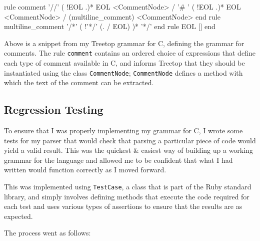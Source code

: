 \begin{code}[language=treetop]
  rule comment
    '//' ( !EOL .)* EOL <CommentNode>
    / '# ' ( !EOL .)* EOL <CommentNode>
    / (multiline_comment) <CommentNode>
  end
  rule multiline_comment
    '/*'
    (
      !'*/'
      (. / EOL)
    )*
    '*/'
  end
  rule EOL
    [\n]
  end
\end{code}

Above is a snippet from my Treetop grammar for C, defining the grammar for
comments. The rule \lstinline|comment| contains an ordered choice of expressions
that define each type of comment available in C, and informs Treetop that they
should be instantiated using the class \lstinline|CommentNode|;
\lstinline|CommentNode| defines a method with which the text of the comment
can be extracted.


  \subsection{Regression Testing}
    To ensure that I was properly implementing my grammar for C, I wrote some
    tests for my parser that would check that parsing a particular piece of code
    would yield a valid result. This was the quickest \& easiest way of building
    up a working grammar for the language and allowed me to be confident that
    what I had written would function correctly as I moved forward.

    This was implemented using \lstinline|TestCase|, a class that is part of the
    Ruby standard library, and simply involves defining methods that execute the
    code required for each test and uses various types of assertions to ensure
    that the results are as expected.

    The process went as follows:

    \begin{center}
    \end{center}

